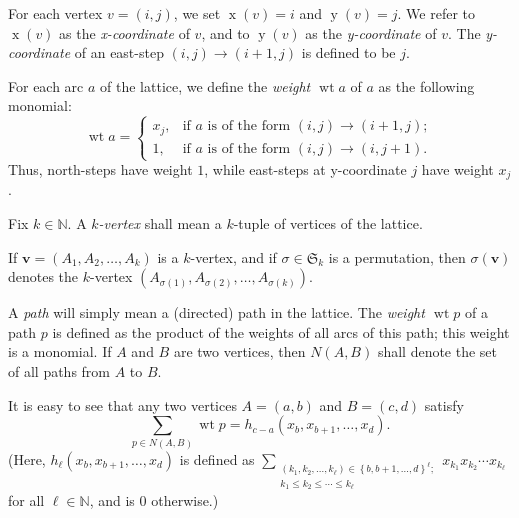\documentclass[reqno]{amsart}
\newcommand{\0}{\phantom{c}}
\let\sumnonlimits\sum
\renewcommand{\sum}{\sumnonlimits\limits}
\newenvironment{verlong}{}{}
\newcommand{\defn}[1]{{\color{darkred}\emph{#1}}} %
\theoremstyle{plain}
\theoremstyle{definition}
\numberwithin{equation}{section}
\begin{document}
For each vertex $v=\left(  i,j\right)  $, we set $\operatorname*{x}\left(
v\right)  =i$ and $\operatorname*{y}\left(  v\right)  =j$. We refer to
$\operatorname*{x}\left(  v\right)  $ as the \defn{x-coordinate} of $v$, and
to $\operatorname*{y}\left(  v\right)  $ as the \defn{y-coordinate} of $v$.
The \defn{y-coordinate} of an east-step $\left(  i,j\right)  \rightarrow
\left(  i+1,j\right)  $ is defined to be $j$.

For each arc $a$ of the lattice, we define the
\defn{weight $\operatorname{wt}a$} of $a$ as the following monomial:%
\[
\operatorname*{wt}a=%
\begin{cases}
x_{j}, & \text{if }a\text{ is of the form }\left(  i,j\right)  \rightarrow
\left(  i+1,j\right)  ;\\
1, & \text{if }a\text{ is of the form }\left(  i,j\right)  \rightarrow\left(
i,j+1\right)  .
\end{cases}
\]
Thus, north-steps have weight $1$, while east-steps at y-coordinate $j$ have
weight $x_{j}$.

Fix $k\in\mathbb{N}$. A \defn{$k$-vertex} shall mean a $k$-tuple of vertices
of the lattice.

\begin{verlong}
If $\mathbf{v}=\left(  A_{1},A_{2},\ldots,A_{k}\right)  $ is a $k$-vertex, and
if $\sigma\in\mathfrak{S}_{k}$ is a permutation, then $\sigma\left(
\mathbf{v}\right)  $ denotes the $k$-vertex $\left(  A_{\sigma\left(
1\right)  },A_{\sigma\left(  2\right)  },\ldots,A_{\sigma\left(  k\right)
}\right)  $.
\end{verlong}

A \defn{path} will simply mean a (directed) path in the lattice. The
\defn{weight $\operatorname{wt}p$} of a path $p$ is defined as the product of
the weights of all arcs of this path; this weight is a monomial. If $A$ and
$B$ are two vertices, then \defn{$N\left(  A,B\right)$} shall denote the set
of all paths from $A$ to $B$.

It is easy to see that any two vertices $A=\left(  a,b\right)  $ and
$B=\left(  c,d\right)  $ satisfy%
\begin{equation}
\sum_{p\in N\left(  A,B\right)  }\operatorname*{wt}p=h_{c-a}\left(
x_{b},x_{b+1},\ldots,x_{d}\right)  . \label{eq.LGV.single-paths}%
\end{equation}
(Here, $h_{\ell}\left(  x_{b},x_{b+1},\ldots,x_{d}\right)  $ is defined as
$\sum_{\substack{\left(  k_{1},k_{2},\ldots,k_{\ell}\right)  \in\left\{
b,b+1,\ldots,d\right\}  ^{\ell};\\k_{1}\leq k_{2}\leq\cdots\leq k_{\ell}%
}}x_{k_{1}}x_{k_{2}}\cdots x_{k_{\ell}}$ for all $\ell\in\mathbb{N}$, and is
$0$ otherwise.)
\end{document}
